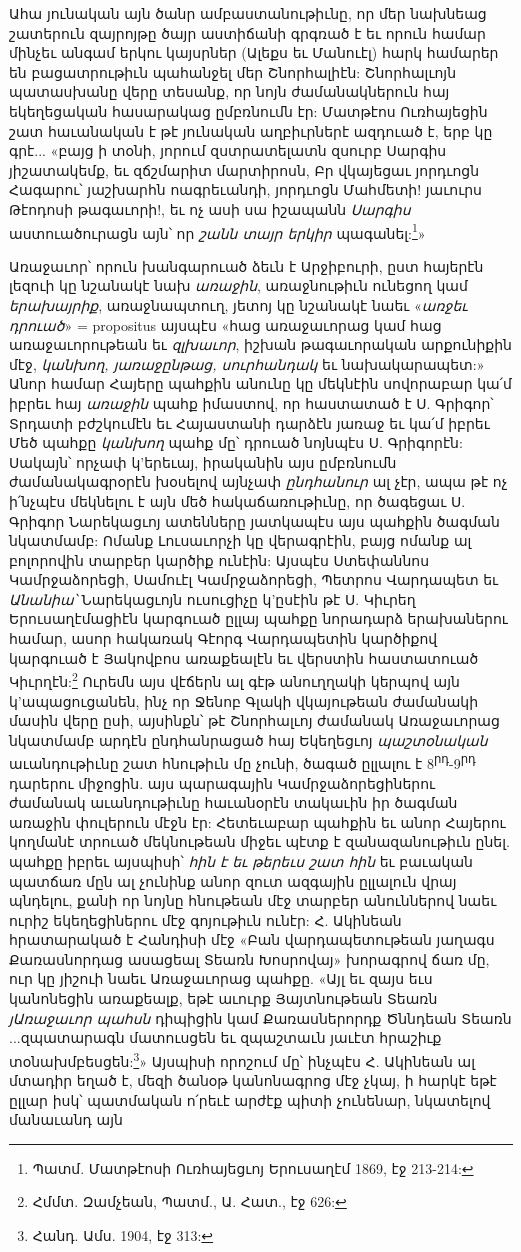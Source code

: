 \documentclass{article}
\begin{document}
{Ահա յունական այն ծանր ամբաստանութիւնը, որ մեր նախնեաց շատերուն զայրոյթը ծայր աստիճանի գրգռած է եւ որուն համար մինչեւ անգամ երկու կայսրներ (Ալեքս եւ Մանուէլ) հարկ համարեր են բացատրութիւն պահանջել մեր Շնորհալիէն: Շնորհալւոյն պատասխանը վերը տեսանք, որ նոյն ժամանակներուն հայ եկեղեցական հասարակաց ըմբռնումն էր: Մատթէոս Ուռհայեցին շատ հաւանական է թէ յունական աղբիւրներէ ազդուած է, երբ կը գրէ... «բայց ի տօնի, յորում զստրատելատն զսուրբ Սարգիս յիշատակեմք, եւ զճշմարիտ մարտիրոսն, Բր վկայեցաւ յորդւոցն Հագարու՝ յաշխարհն ոագրեւանդի, յորդւոցն Մահմետի! յաւուրս Թէոդոսի թագաւորի!, եւ ոչ ասի սա իշապանն \emph{Սարգիս} աստուածուրացն այն՝ որ \emph{շանն տայր երկիր} պագանել:\footnote{Պատմ. Մատթէոսի Ուռհայեցւոյ Երուսաղէմ 1869, էջ 213-214:}»

Առաջաւոր՝ որուն խանգարուած ձեւն է Արջիբուրի, ըստ հայերէն լեզուի կը նշանակէ նախ \emph{առաջին}, առաջնութիւն ունեցող կամ \emph{երախայրիք}, առաջնապտուղ, յետոյ կը նշանակէ նաեւ «\emph{առջեւ դրուած}» = propositus այսպէս «հաց առաջաւորաց կամ հաց առաջաւորութեան եւ \emph{զլխաւոր}, իշխան թագաւորական արքունիքին մէջ, \emph{կանխող, յառաջընթաց, սուրհանդակ} եւ նախակարապետ:» Անոր համար Հայերը պահքին անունը կը մեկնէին սովորաբար կա՛մ իբրեւ հայ \emph{առաջին} պահք իմաստով, որ հաստատած է Ս. Գրիգոր՝ Տրդատի բժշկումէն եւ Հայաստանի դարձէն յառաջ եւ կա՛մ իբրեւ Մեծ պահքը \emph{կանխող} պահք մը՝ դրուած նոյնպէս Ս. Գրիգորէն: Սակայն՝ որչափ կ'երեւայ, իրականին այս ըմբռնումն ժամանակագրօրէն խօսելով այնչափ \emph{ընդհանուր} ալ չէր, ապա թէ ոչ ի՛նչպէս մեկնելու է այն մեծ հակաճառութիւնը, որ ծագեցաւ Ս. Գրիգոր Նարեկացւոյ ատենները յատկապէս այս պահքին ծագման նկատմամբ: Ոմանք Լուսաւորչի կը վերագրէին, բայց ոմանք ալ բոլորովին տարբեր կարծիք ունէին: Այսպէս Ստեփաննոս Կամրջաձորեցի, Սամուէլ Կամրջաձորեցի, Պետրոս Վարդապետ եւ \emph{Անանիա՝} Նարեկացւոյն ուսուցիչը կ'ըսէին թէ Ս. Կիւրեղ Երուսաղէմացիէն կարգուած ըլլայ պահքը նորադարձ երախաներու համար, ասոր հակառակ Գէորգ Վարդապետին կարծիքով կարգուած է Յակովբոս առաքեալէն եւ վերստին հաստատուած Կիւրղէն:\footnote{Հմմտ. Զամչեան, Պատմ., Ա. Հատ., էջ 626:} Ուրեմն այս վէճերն ալ գէթ անուղղակի կերպով այն կ'ապացուցանեն, ինչ որ Ջենոբ Գլակի վկայութեան ժամանակի մասին վերը ըսի, այսինքն՝ թէ Շնորհալւոյ ժամանակ Առաջաւորաց նկատմամբ արդէն ընդհանրացած հայ Եկեղեցւոյ \emph{պաշտօնական} աւանդութիւնը շատ հնութիւն մը չունի, ծագած ըլլալու է 8\textsuperscript{րդ}-9\textsuperscript{րդ} դարերու միջոցին. այս պարագային Կամրջաձորեցիներու ժամանակ աւանդութիւնը հաւանօրէն տակաւին իր ծագման առաջին փուլերուն մէջն էր: Հետեւաբար պահքին եւ անոր Հայերու կողմանէ տրուած մեկնութեան միջեւ պէտք է զանազանութիւն ընել. պահքը իբրեւ այսպիսի՝ \emph{հին է եւ թերեւս շատ հին} եւ բաւական պատճառ մըն ալ չունինք անոր զուտ ազգային ըլլալուն վրայ պնդելու, քանի որ նոյնը հնութեան մէջ տարբեր անուններով նաեւ ուրիշ եկեղեցիներու մէջ գոյութիւն ունէր: Հ. Ակինեան հրատարակած է Հանդիսի մէջ «Բան վարդապետութեան յաղագս Քառասնորդաց ասացեալ Տեառն Խոսրովայ» խորագրով ճառ մը, ուր կը յիշուի նաեւ Առաջաւորաց պահքը. «Այլ եւ զայս եւս կանոնեցին առաքեալք, եթէ աւուրք Յայտնութեան Տեառն \emph{յԱռաջաւոր պահսն} դիպիցին կամ Քառասներորդք Ծննդեան Տեառն ...զպատարագն մատուսցեն եւ զպաշտաւն յաւէտ հրաշիւք տօնախմբեսցեն:\footnote{Հանդ. Ամս. 1904, էջ 313:}» Այսպիսի որոշում մը՝ ինչպէս Հ. Ակինեան ալ մտադիր եղած է, մեզի ծանօթ կանոնագրոց մէջ չկայ, ի հարկէ եթէ ըլլար իսկ՝ պատմական ո՛րեւէ արժէք պիտի չունենար, նկատելով մանաւանդ այն }
\end{document}
